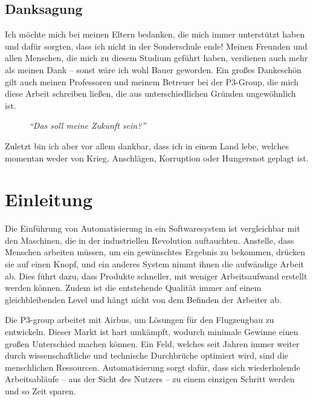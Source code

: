   \subsection*{Danksagung}
  \label{ssec:Danksagung}
    Ich möchte mich bei meinen Eltern bedanken, die mich immer unterstützt haben und dafür sorgten, dass ich nicht in der Sonderschule ende! Meinen Freunden und allen Menschen, die mich zu diesem Studium geführt haben, verdienen auch mehr als meinen Dank -- sonst wäre ich wohl Bauer geworden. Ein großes Dankeschön gilt auch meinen Professoren und meinem Betreuer bei der P3-Group, die mich diese Arbeit schreiben ließen, die aus unterschiedlichen Gründen ungewöhnlich ist.
    \begin{figure}[H]
      \centering
      \caption{\textit{``Das soll meine Zukunft sein?''}}
    \end{figure}

    Zuletzt bin ich aber vor allem dankbar, dass ich in einem Land lebe, welches momentan weder von Krieg, Anschlägen, Korruption oder Hungersnot geplagt ist.

\section{Einleitung}
\label{sec:Einleitung}
  Die Einführung von Automatisierung in ein Softwaresystem ist vergleichbar mit den Maschinen, die in der industriellen Revolution auftauchten. Anstelle, dass Menschen arbeiten müssen, um ein gewünschtes Ergebnis zu bekommen, drücken sie auf einen Knopf, und ein anderes System nimmt ihnen die aufwändige Arbeit ab. Dies führt dazu, dass Produkte schneller, mit weniger Arbeitsaufwand erstellt werden können. Zudem ist die entstehende Qualität immer auf einem gleichbleibenden Level und hängt nicht von dem Befinden der Arbeiter ab.

  Die P3-group arbeitet mit Airbus, um Lösungen für den Flugzeugbau zu entwickeln. Dieser Markt ist hart umkämpft, wodurch minimale Gewinne einen großen Unterschied machen können. Ein Feld, welches seit Jahren immer weiter durch wissenschaftliche und technische Durchbrüche optimiert wird, sind die menschlichen Ressourcen. Automatisierung sorgt dafür, dass sich wiederholende Arbeitsabläufe -- aus der Sicht des Nutzers -- zu einem einzigen Schritt werden und so Zeit sparen.

